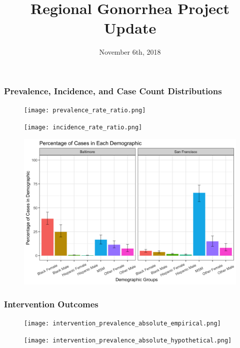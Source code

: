 \documentclass[]{article}
\title{Regional Gonorrhea Project Update}
\author{}
\date{November 6th, 2018}
\begin{document}
\maketitle

\subsubsection{Prevalence, Incidence, and Case Count
Distributions}\label{prevalence-incidence-and-case-count-distributions}

\begin{figure}
\centering
\texttt{[image: prevalence\_rate\_ratio.png]}
\caption{}
\end{figure}

\begin{figure}
\centering
\texttt{[image: incidence\_rate\_ratio.png]}
\caption{}
\end{figure}

\begin{figure}
\centering
\includegraphics{distribution_of_cases.png}
\caption{}
\end{figure}

\subsubsection{Intervention Outcomes}\label{intervention-outcomes}

\begin{figure}
\centering
\texttt{[image: intervention\_prevalence\_absolute\_empirical.png]}
\caption{}
\end{figure}

\begin{figure}
\centering
\texttt{[image: intervention\_prevalence\_absolute\_hypothetical.png]}
\caption{}
\end{figure}
\end{document}
